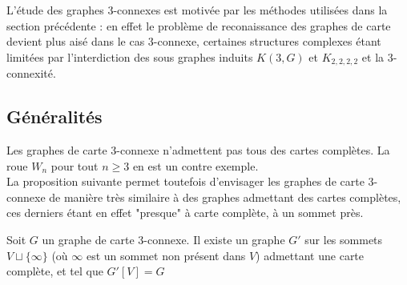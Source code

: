 \documentclass{scrartcl}
\begin{document}
\begin{flushleft}
L'étude des graphes $3$-connexes est motivée par les méthodes utilisées dans la section précédente : en effet le problème de
reconaissance des graphes de carte devient plus aisé dans le cas $3$-connexe, certaines structures complexes étant limitées
par l'interdiction des sous graphes induits $K(3, G)$ et $K_{2,2,2,2}$ et la $3$-connexité.

\subsection{Généralités}

Les graphes de carte $3$-connexe n'admettent pas tous des cartes complètes. La roue $W_n$ pour tout $n \geq 3$
en est un contre exemple.\\
La proposition suivante permet toutefois d'envisager les graphes de carte $3$-connexe de manière très similaire à des graphes admettant
des cartes complètes, ces derniers étant en effet "presque" à carte complète, à un sommet près.

\begin{prop}\label{3connCompl}
    Soit $G$ un graphe de carte $3$-connexe. Il existe un graphe $G'$ sur les sommets $V \sqcup \{\infty\}$ (où $\infty$ est un sommet non
    présent dans $V$) admettant une carte complète, et tel que $G'[V] = G$
\end{prop}


\end{flushleft}
\end{document}
